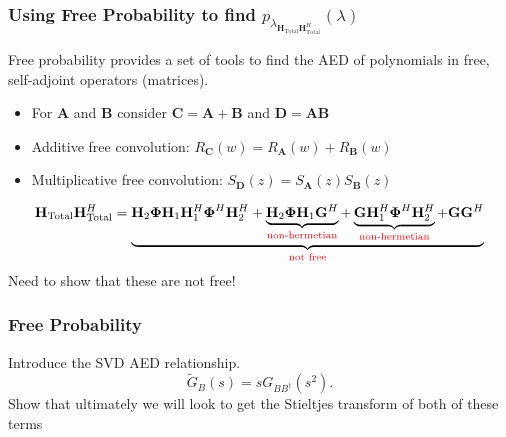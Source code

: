 \documentclass[10pt,tgadventor, onlymath]{beamer}
\begin{document}
\begin{frame}
\frametitle{Using Free Probability to find $p_{\lambda_{\mathbf{H}_{\text{Total}}\mathbf{H}_{\text{Total}}^H}}(\lambda)$}
Free probability provides a set of tools to find the AED of polynomials in free, self-adjoint operators (matrices).

\begin{itemize}
\item 
	For $\mathbf{A}$ and $\textbf{B}$ consider $\mathbf{C} = \mathbf{A} + \textbf{B}$ and $\mathbf{D} = \mathbf{A}\textbf{B}$
\item 
	Additive free convolution: $R_{\mathbf{C}}(w) = R_{\mathbf{A}}(w) + R_{\mathbf{B}}(w)$
\item 
	Multiplicative free convolution: $S_{\mathbf{D}}(z) = S_{\mathbf{A}}(z)S_{\mathbf{B}}(z)$
\end{itemize}

\begin{equation*}
\mathbf{H}_{\text{Total}}\mathbf{H}_{\text{Total}}^H 
= 
\underbrace{
\mathbf{H}_{2}\boldsymbol{\Phi}\mathbf{H}_{1}\mathbf{H}_{1}^H\boldsymbol{\Phi}^H\mathbf{H}_{2}^H +
\underbrace{\mathbf{H}_{2}\boldsymbol{\Phi}\mathbf{H}_{1}\mathbf{G}^H}_{\color{red}{\text{non-hermetian}}}+
\underbrace{\mathbf{G}\mathbf{H}_{1}^H\boldsymbol{\Phi}^H\mathbf{H}_{2}^H}_{\color{red}{\text{non-hermetian}}}+
\mathbf{G}\mathbf{G}^H
}_
{\color{red}{\text{not free}}}
\end{equation*}
Need to show that these are not free!
\end{frame}

\begin{frame}
\frametitle{Free Probability}
Introduce the SVD AED relationship.
\begin{equation}\label{svd_aed_property}
\tilde{G}_{B}(s) = sG_{BB^{\dagger}}(s^2).
\end{equation}
Show that ultimately we will look to get the Stieltjes transform of both of these terms
\end{frame}
\end{document}
